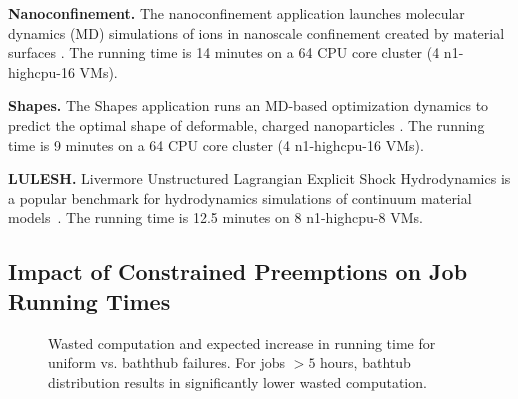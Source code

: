\documentclass[sigconf]{acmart} %
\newcommand{\myfigspace}[0]{-0.45cm}
\newcommand{\subsecspace}[0]{-0.20cm}
\begin{document}
\noindent \textbf{Nanoconfinement.}
The nanoconfinement application launches molecular dynamics (MD) simulations of ions in nanoscale confinement created by material surfaces \cite{jing2015ionic,kadupitiya2017}. The running time is 14 minutes on a 64 CPU core cluster (4 n1-highcpu-16 VMs). 

\noindent \textbf{Shapes.} The Shapes application runs an MD-based optimization dynamics to predict the optimal shape of deformable, charged nanoparticles \cite{jto1,brunk2019computational}. The running time is 9 minutes on a 64 CPU core cluster (4 n1-highcpu-16 VMs). 

\noindent \textbf{LULESH.} Livermore Unstructured Lagrangian Explicit Shock Hydrodynamics is a popular benchmark 
for hydrodynamics simulations of continuum material models~\cite{IPDPS13:LULESH,LULESH2:changes}. The running time is 12.5 minutes on 8 n1-highcpu-8 VMs.

\vspace*{\subsecspace}
\subsection{Impact of Constrained Preemptions on Job Running Times}

\begin{figure}[t]
  \vspace*{\myfigspace}    
    \vspace*{-0.4cm}
    \caption{Wasted computation and expected increase in running time for uniform vs. baththub failures. For jobs $>5$ hours, bathtub distribution results in significantly lower wasted computation.}
\vspace*{\myfigspace}    
  \label{fig:vs-uniform-both}
  
\end{figure}
\end{document}
